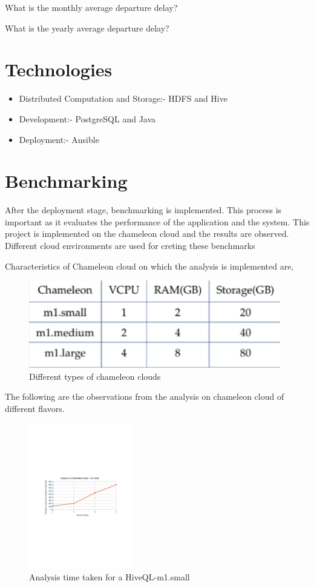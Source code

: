 \documentclass[9pt,twocolumn,twoside]{../../styles/osajnl}
\begin{document}
  What is the monthly average departure delay?

  What is the yearly average departure delay?

\section{Technologies}

\begin{itemize}
\item Distributed Computation and Storage:- HDFS and Hive
\item Development:- PostgreSQL and Java
\item Deployment:- Ansible
\end{itemize}

\section{Benchmarking}

After the deployment stage, benchmarking is implemented. This process
is important as it evaluates the performance of the application and
the system. This project is implemented on the chameleon cloud and the
results are observed. Different cloud environments are used for
creting these benchmarks

Characteristics of Chameleon cloud on which the analysis is implemented are,

\begin{figure}[ht]
  \includegraphics[width= \linewidth, height =
    1.5in]{images/chameleonfla.pdf}
  \caption{Different types of chameleon clouds}
\end{figure}

The following are the observations from the analysis on chameleon
cloud of different flavors.

\begin{figure}[htbp]
  \includegraphics[width= \linewidth, height =
    2.5in]{images/m1small.pdf}
  \caption{Analysis time taken for a HiveQL-m1.small }
\end{figure}
\end{document}
